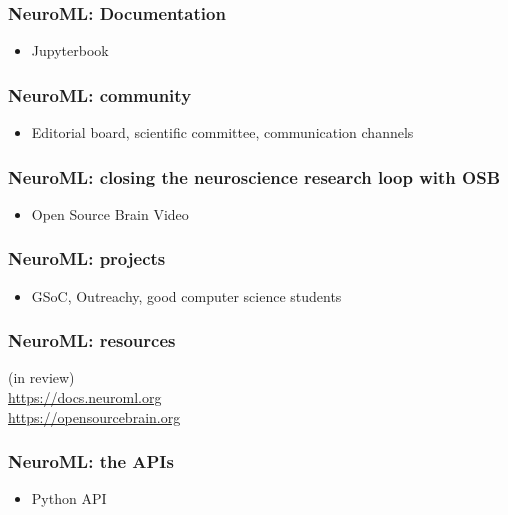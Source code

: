 \begin{frame}[c]
  \frametitle{NeuroML: Documentation}
  \begin{itemize}
    \item Jupyterbook
  \end{itemize}
\end{frame}
\begin{frame}[c]
  \frametitle{NeuroML: community}
  \begin{itemize}
    \item Editorial board, scientific committee, communication channels
  \end{itemize}
\end{frame}
\begin{frame}[c]
  \frametitle{NeuroML: closing the neuroscience research loop with OSB}
  \begin{itemize}
    \item Open Source Brain Video
  \end{itemize}
\end{frame}
\begin{frame}[c]
  \frametitle{NeuroML: projects}
  \begin{itemize}
    \item GSoC, Outreachy, good computer science students
  \end{itemize}
\end{frame}
\begin{frame}[c]
  \frametitle{NeuroML: resources}
  \begin{center}
    (in review)\\\vspace{1cm}
    \Large{\url{https://docs.neuroml.org}}\\
    \Large{\url{https://opensourcebrain.org}}
  \end{center}
\end{frame}
\begin{frame}[c]
  \frametitle{NeuroML: the APIs}
  \begin{itemize}
    \item Python API
  \end{itemize}
\end{frame}

